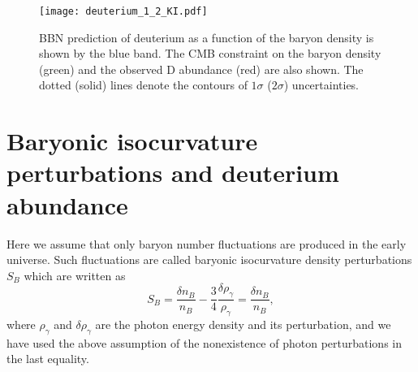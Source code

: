 \documentclass[11pt,a4paper]{article}
\begin{document}
\begin{figure}
  \centering \texttt{[image: deuterium\_1\_2\_KI.pdf]}
  \caption{%
  BBN prediction of deuterium as a function of the baryon  density is shown by the blue band.
  The CMB constraint on the baryon density (green) and the observed D abundance (red) are also shown. The dotted (solid) lines denote the contours of $1\sigma$ ($2\sigma$) uncertainties.
}
  \label{fig:deuterium_2sigma}
\end{figure}


\section{Baryonic isocurvature perturbations and deuterium abundance}
\label{sec:baryon_isocurvature}

Here we assume that only baryon number fluctuations are produced in the early universe.
Such fluctuations are called baryonic isocurvature density perturbations $S_B$ which are written as
\begin{equation}
    S_B = \frac{\delta n_B}{n_B}
    -\frac{3}{4}\frac{\delta\rho_\gamma}{\rho_\gamma}
    =\frac{\delta n_B}{n_B},
\end{equation}
%
where $\rho_\gamma$ and $\delta\rho_\gamma$ are the photon energy density and its perturbation, and we have used the above assumption of the nonexistence of photon perturbations in the last equality.
\end{document}
